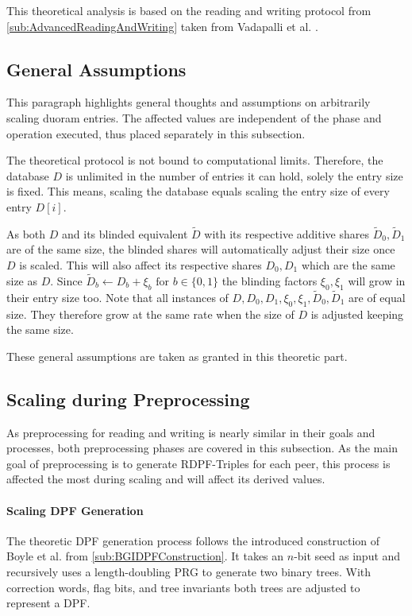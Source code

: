 This theoretical analysis is based on the reading and writing protocol from \ref{sub:AdvancedReadingAndWriting} taken from Vadapalli et al. \cite{vadapalli2023duoram}.

\subsection*{General Assumptions} \label{subsub:ScalingInTheoryGeneralAssumptions}
This paragraph highlights general thoughts and assumptions on arbitrarily scaling duoram entries.
The affected values are independent of the phase and operation executed, thus placed separately in this subsection.

The theoretical protocol is not bound to computational limits.
Therefore, the database $D$ is unlimited in the number of entries it can hold, solely the entry size is fixed.
This means, scaling the database equals scaling the entry size of every entry $D[i]$.

As both $D$ and its blinded equivalent $\widetilde{D}$ with its respective additive shares $\widetilde{D}_0,\widetilde{D}_1$ are of the same size, the blinded shares will automatically adjust their size once $D$ is scaled.
This will also affect its respective shares $D_0,D_1$ which are the same size as $D$.
Since $\widetilde{D}_b\leftarrow D_b+\xi_b\text{ for } b\in\{0,1\}$ the blinding factors $\xi_0,\xi_1$ will grow in their entry size too.
Note that all instances of $D,D_0,D_1,\xi_0,\xi_1,\widetilde{D}_0,\widetilde{D}_1$ are of equal size.
They therefore grow at the same rate when the size of $D$ is adjusted keeping the same size.

These general assumptions are taken as granted in this theoretic part.

\subsection*{Scaling during Preprocessing} \label{subsub:ScalingDuringPreprocessing}
As preprocessing for reading and writing is nearly similar in their goals and processes, both preprocessing phases are covered in this subsection.
As the main goal of preprocessing is to generate RDPF-Triples for each peer, this process is affected the most during scaling and will affect its derived values.

\paragraph{Scaling DPF Generation}\label{par:ScalingInTheoryDPFGeneration}
The theoretic DPF generation process follows the introduced construction of Boyle et al. \cite{boyle2016function} from \ref{sub:BGIDPFConstruction}.
It takes an $n$-bit seed as input and recursively uses a length-doubling PRG to generate two binary trees.
With correction words, flag bits, and tree invariants both trees are adjusted to represent a DPF.

